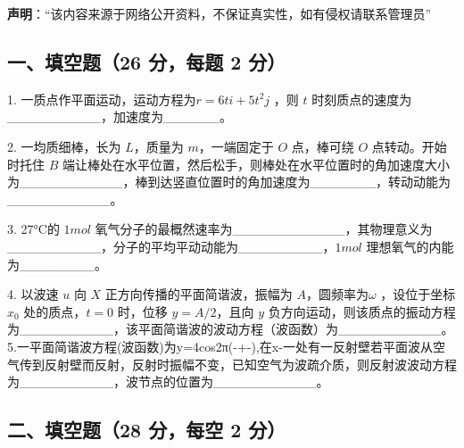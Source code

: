 
\textbf{声明}：“该内容来源于网络公开资料，不保证真实性，如有侵权请联系管理员”

\subsection{一、填空题（26 分，每题 2 分）}
1. 一质点作平面运动，运动方程为$r=6ti+5t^2j$ ，则 $t$ 时刻质点的速度为__________，加速度为______。

2. 一均质细棒，长为 $L$，质量为 $m$，一端固定于 $O$ 点，棒可绕 $O$ 点转动。开始时托住 $B$ 端让棒处在水平位置，然后松手，则棒处在水平位置时的角加速度大小为___________，棒到达竖直位置时的角加速度为_______，转动动能为___________。

3. 27°C的 $1mol$ 氧气分子的最概然速率为____________，其物理意义为__________，分子的平均平动动能为_________，$1mol$ 理想氧气的内能为________。

4. 以波速 $u$ 向 $X$ 正方向传播的平面简谐波，振幅为 $A$，圆频率为$\omega$ ，设位于坐标 $x_0$ 处的质点，$t=0$ 时，位移 $y=A/2$，且向 $y$ 负方向运动，则该质点的振动方程为__________，该平面简谐波的波动方程（波函数）为___________。
5.一平面简谐波方程(波函数)为y=4cos2π(-+-),在x-一处有一反射壁若平面波从空气传到反射壁而反射，反射时振幅不变，已知空气为波疏介质，则反射波波动方程为__________，波节点的位置为___________。
\subsection{二、填空题（28 分，每空 2 分）}